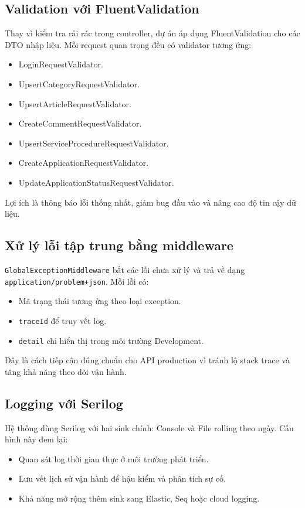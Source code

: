 \documentclass[12pt,a4paper]{article}
\begin{document}
\subsection{Validation với FluentValidation}
Thay vì kiểm tra rải rác trong controller, dự án áp dụng FluentValidation cho các DTO nhập liệu. Mỗi request quan trọng đều có validator tương ứng:
\begin{itemize}[leftmargin=1.1cm]
  \item LoginRequestValidator.
  \item UpsertCategoryRequestValidator.
  \item UpsertArticleRequestValidator.
  \item CreateCommentRequestValidator.
  \item UpsertServiceProcedureRequestValidator.
  \item CreateApplicationRequestValidator.
  \item UpdateApplicationStatusRequestValidator.
\end{itemize}

Lợi ích là thông báo lỗi thống nhất, giảm bug đầu vào và nâng cao độ tin cậy dữ liệu.

\subsection{Xử lý lỗi tập trung bằng middleware}
\texttt{GlobalExceptionMiddleware} bắt các lỗi chưa xử lý và trả về dạng \texttt{application/problem+json}. Mỗi lỗi có:
\begin{itemize}[leftmargin=1.1cm]
  \item Mã trạng thái tương ứng theo loại exception.
  \item \texttt{traceId} để truy vết log.
  \item \texttt{detail} chỉ hiển thị trong môi trường Development.
\end{itemize}

Đây là cách tiếp cận đúng chuẩn cho API production vì tránh lộ stack trace và tăng khả năng theo dõi vận hành.

\subsection{Logging với Serilog}
Hệ thống dùng Serilog với hai sink chính: Console và File rolling theo ngày. Cấu hình này đem lại:
\begin{itemize}[leftmargin=1.1cm]
  \item Quan sát log thời gian thực ở môi trường phát triển.
  \item Lưu vết lịch sử vận hành để hậu kiểm và phân tích sự cố.
  \item Khả năng mở rộng thêm sink sang Elastic, Seq hoặc cloud logging.
\end{itemize}
\end{document}
